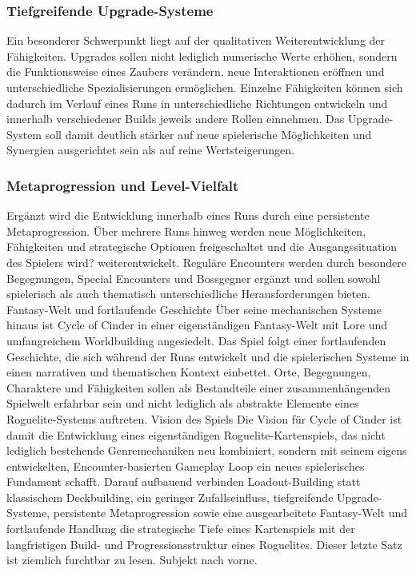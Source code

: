 \subsubsection*{Tiefgreifende Upgrade-Systeme}
Ein besonderer Schwerpunkt liegt auf der qualitativen Weiterentwicklung der Fähigkeiten. Upgrades sollen nicht lediglich numerische Werte erhöhen, sondern die Funktionsweise eines Zaubers verändern, neue Interaktionen eröffnen und unterschiedliche Spezialisierungen ermöglichen. Einzelne Fähigkeiten können sich dadurch im Verlauf eines Runs in unterschiedliche Richtungen entwickeln und innerhalb verschiedener Builds jeweils andere Rollen einnehmen. Das Upgrade-System soll damit deutlich stärker auf neue spielerische Möglichkeiten und Synergien ausgerichtet sein als auf reine Wertsteigerungen.

\subsubsection*{Metaprogression und Level-Vielfalt}
Ergänzt wird die Entwicklung innerhalb eines Runs durch eine persistente Metaprogression. Über mehrere Runs hinweg werden neue Möglichkeiten, Fähigkeiten und strategische Optionen freigeschaltet und die Ausgangssituation des Spielers wird? weiterentwickelt. Reguläre Encounters werden durch besondere Begegnungen, Special Encounters und Bossgegner ergänzt und sollen sowohl spielerisch als auch thematisch unterschiedliche Herausforderungen bieten.
Fantasy-Welt und fortlaufende Geschichte
Über seine mechanischen Systeme hinaus ist Cycle of Cinder in einer eigenständigen Fantasy-Welt mit Lore und umfangreichem Worldbuilding angesiedelt. Das Spiel folgt einer fortlaufenden Geschichte, die sich während der Runs entwickelt und die spielerischen Systeme in einen narrativen und thematischen Kontext einbettet. Orte, Begegnungen, Charaktere und Fähigkeiten sollen als Bestandteile einer zusammenhängenden Spielwelt erfahrbar sein und nicht lediglich als abstrakte Elemente eines Roguelite-Systems auftreten.
Vision des Spiels
Die Vision für Cycle of Cinder ist damit die Entwicklung eines eigenständigen Roguelite-Kartenspiels, das nicht lediglich bestehende Genremechaniken neu kombiniert, sondern mit seinem eigens entwickelten, Encounter-basierten Gameplay Loop ein neues spielerisches Fundament schafft. Darauf aufbauend verbinden Loadout-Building statt klassischem Deckbuilding, ein geringer Zufallseinfluss, tiefgreifende Upgrade-Systeme, persistente Metaprogression sowie eine ausgearbeitete Fantasy-Welt und fortlaufende Handlung die strategische Tiefe eines Kartenspiels mit der langfristigen Build- und Progressionsstruktur eines Roguelites.
Dieser letzte Satz ist ziemlich furchtbar zu lesen. Subjekt nach vorne.

